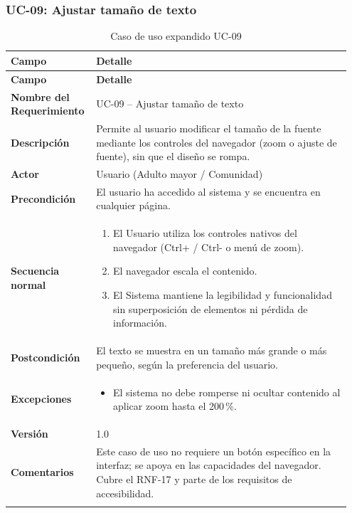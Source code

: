 \subsubsection{UC-09: Ajustar tamaño de texto}

\begin{longtable}{p{0.22\linewidth} p{0.73\linewidth}}
\toprule
\rowcolor{tableheader!20}
\textbf{Campo} & \textbf{Detalle} \\
\midrule
\endfirsthead
\rowcolor{tableheader!20}
\textbf{Campo} & \textbf{Detalle} \\
\midrule
\endhead
\bottomrule
\endfoot
\textbf{Nombre del Requerimiento} & UC-09 -- Ajustar tamaño de texto \\
\textbf{Descripción} & Permite al usuario modificar el tamaño de la fuente mediante los controles del navegador (zoom o ajuste de fuente), sin que el diseño se rompa. \\
\textbf{Actor} & Usuario (Adulto mayor / Comunidad) \\
\textbf{Precondición} & El usuario ha accedido al sistema y se encuentra en cualquier página. \\
\textbf{Secuencia normal} & 
  \begin{enumerate}
    \item El Usuario utiliza los controles nativos del navegador (Ctrl+ / Ctrl- o menú de zoom).
    \item El navegador escala el contenido.
    \item El Sistema mantiene la legibilidad y funcionalidad sin superposición de elementos ni pérdida de información.
  \end{enumerate} \\
\textbf{Postcondición} & El texto se muestra en un tamaño más grande o más pequeño, según la preferencia del usuario. \\
\textbf{Excepciones} & 
  \begin{itemize}
    \item El sistema no debe romperse ni ocultar contenido al aplicar zoom hasta el 200\,\%.
  \end{itemize} \\
\textbf{Versión} & 1.0 \\
\textbf{Comentarios} & Este caso de uso no requiere un botón específico en la interfaz; se apoya en las capacidades del navegador. Cubre el RNF-17 y parte de los requisitos de accesibilidad. \\
\bottomrule
\caption{Caso de uso expandido UC-09}
\label{tab:uc09}
\end{longtable}

